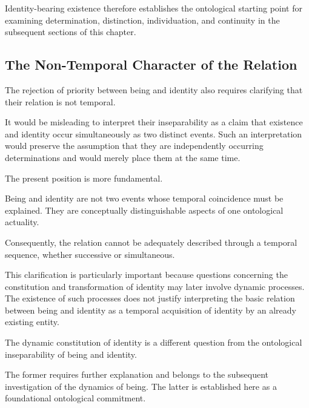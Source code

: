Identity-bearing existence therefore establishes
the ontological starting point for examining
determination, distinction, individuation, and
continuity in the subsequent sections of this
chapter.



\subsection{The Non-Temporal Character of the Relation}
\label{subsec:non-temporal-character-of-relation}

The rejection of priority between being and identity
also requires clarifying that their relation is not
temporal.

It would be misleading to interpret their
inseparability as a claim that existence and
identity occur simultaneously as two distinct
events. Such an interpretation would preserve
the assumption that they are independently
occurring determinations and would merely place
them at the same time.

The present position is more fundamental.

Being and identity are not two events whose
temporal coincidence must be explained. They
are conceptually distinguishable aspects of
one ontological actuality.

Consequently, the relation cannot be adequately
described through a temporal sequence, whether
successive or simultaneous.

This clarification is particularly important
because questions concerning the constitution
and transformation of identity may later involve
dynamic processes. The existence of such processes
does not justify interpreting the basic relation
between being and identity as a temporal
acquisition of identity by an already existing
entity.

The dynamic constitution of identity is a
different question from the ontological
inseparability of being and identity.

The former requires further explanation and
belongs to the subsequent investigation of
the dynamics of being. The latter is established
here as a foundational ontological commitment.



